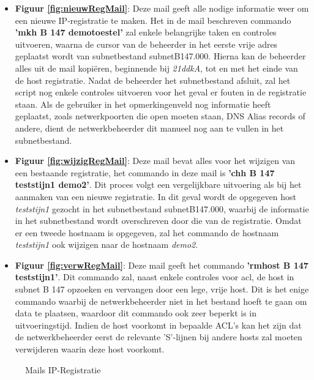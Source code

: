 \begin{itemize}
    \item \textbf{Figuur \ref{fig:nieuwRegMail}}: Deze mail geeft alle nodige informatie weer om een nieuwe IP-registratie te maken. Het in de mail beschreven commando \\\textbf{'mkh B 147 demotoestel'} zal enkele belangrijke taken en controles uitvoeren, waarna de cursor van de beheerder in het eerste vrije adres geplaatst wordt van subnetbestand subnetB147.000. Hierna kan de beheerder alles uit de mail kopiëren, beginnende bij \textit{21ddkA}, tot en met het einde van de host registratie. Nadat de beheerder het subnetbestand afsluit, zal het script nog enkele controles uitvoeren voor het geval er fouten in de registratie staan. Als de gebruiker in het opmerkingenveld nog informatie heeft geplaatst, zoals netwerkpoorten die open moeten staan, DNS Alias records of andere, dient de netwerkbeheerder dit manueel nog aan te vullen in het subnetbestand.
    \item \textbf{Figuur \ref{fig:wijzigRegMail}}: Deze mail bevat alles voor het wijzigen van een bestaande registratie, het commando in deze mail is \textbf{'chh B 147 teststijn1 demo2'}. Dit proces volgt een vergelijkbare uitvoering als bij het aanmaken van een nieuwe registratie. In dit geval wordt de opgegeven host \textit{teststijn1} gezocht in het subnetbestand subnetB147.000, waarbij de informatie in het subnetbestand wordt overschreven door die van de registratie. Omdat er een tweede hostnaam is opgegeven, zal het commando de hostnaam \textit{teststijn1} ook wijzigen naar de hostnaam \textit{demo2}.
    \item \textbf{Figuur \ref{fig:verwRegMail}}: Deze mail geeft het commando \textbf{'rmhost B 147 teststijn1'}. Dit commando zal, naast enkele controles voor \acrshort{acl}, de host in subnet B 147 opzoeken en vervangen door een lege, vrije host. Dit is het enige commando waarbij de netwerkbeheerder niet in het bestand hoeft te gaan om data te plaatsen, waardoor dit commando ook zeer beperkt is in uitvoeringstijd. Indien de host voorkomt in bepaalde ACL's kan het zijn dat de netwerkbeheerder eerst de relevante 'S'-lijnen bij andere hosts zal moeten verwijderen waarin deze host voorkomt.
\end{itemize}

\begin{figure}[H]
    \hspace*{\fill}
    \hspace*{\fill}
    \caption{Mails IP-Registratie}
    \label{fig:netadminMail}
\end{figure}

